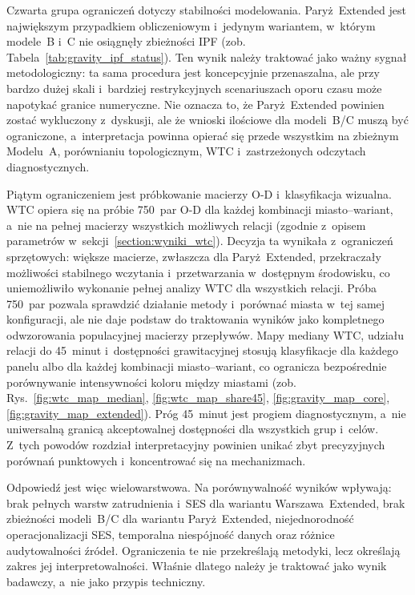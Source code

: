 \documentclass{pracamgr}
\begin{document}
Czwarta grupa ograniczeń dotyczy stabilności modelowania. \mbox{Paryż~Extended} jest największym przypadkiem obliczeniowym i~jedynym wariantem, w~którym modele~B i~C nie osiągnęły zbieżności \mbox{IPF} (zob. Tabela~\ref{tab:gravity_ipf_status}). Ten wynik należy traktować jako ważny sygnał metodologiczny: ta sama procedura jest koncepcyjnie przenaszalna, ale przy bardzo dużej skali i~bardziej restrykcyjnych scenariuszach oporu czasu może napotykać granice numeryczne. Nie oznacza to, że \mbox{Paryż~Extended} powinien zostać wykluczony z~dyskusji, ale że wnioski ilościowe dla modeli~B/C muszą być ograniczone, a~interpretacja powinna opierać się przede wszystkim na zbieżnym Modelu~A, porównianiu topologicznym, \mbox{WTC} i~zastrzeżonych odczytach diagnostycznych.

Piątym ograniczeniem jest próbkowanie macierzy \mbox{O-D} i~klasyfikacja wizualna. \mbox{WTC} opiera się na próbie 750~par \mbox{O-D} dla każdej kombinacji \mbox{miasto--wariant}, a~nie na pełnej macierzy wszystkich możliwych relacji (zgodnie z~opisem parametrów w~sekcji~\ref{section:wyniki_wtc}). Decyzja ta wynikała z~ograniczeń sprzętowych: większe macierze, zwłaszcza dla \mbox{Paryż~Extended}, przekraczały możliwości stabilnego wczytania i~przetwarzania w~dostępnym środowisku, co uniemożliwiło wykonanie pełnej analizy WTC dla wszystkich relacji. Próba 750~par pozwala sprawdzić działanie metody i~porównać miasta w~tej samej konfiguracji, ale nie daje podstaw do traktowania wyników jako kompletnego odwzorowania populacyjnej macierzy przepływów. Mapy mediany \mbox{WTC}, udziału relacji do 45~minut i~dostępności grawitacyjnej stosują klasyfikacje dla każdego panelu albo dla każdej kombinacji miasto--wariant, co ogranicza bezpośrednie porównywanie intensywności koloru między miastami (zob. Rys.~\ref{fig:wtc_map_median}, \ref{fig:wtc_map_share45}, \ref{fig:gravity_map_core}, \ref{fig:gravity_map_extended}). Próg 45~minut jest progiem diagnostycznym, a~nie uniwersalną granicą akceptowalnej dostępności dla wszystkich grup i~celów. Z~tych powodów rozdział interpretacyjny powinien unikać zbyt precyzyjnych porównań punktowych i~koncentrować się na mechanizmach.

Odpowiedź jest więc wielowarstwowa. Na porównywalność wyników wpływają: brak pełnych warstw zatrudnienia i~\mbox{SES} dla wariantu \mbox{Warszawa~Extended}, brak zbieżności modeli~B/C dla wariantu \mbox{Paryż~Extended}, niejednorodność operacjonalizacji \mbox{SES}, temporalna niespójność danych oraz różnice audytowalności źródeł. Ograniczenia te nie przekreślają metodyki, lecz określają zakres jej interpretowalności. Właśnie dlatego należy je traktować jako wynik badawczy, a~nie jako przypis techniczny.
\end{document}
